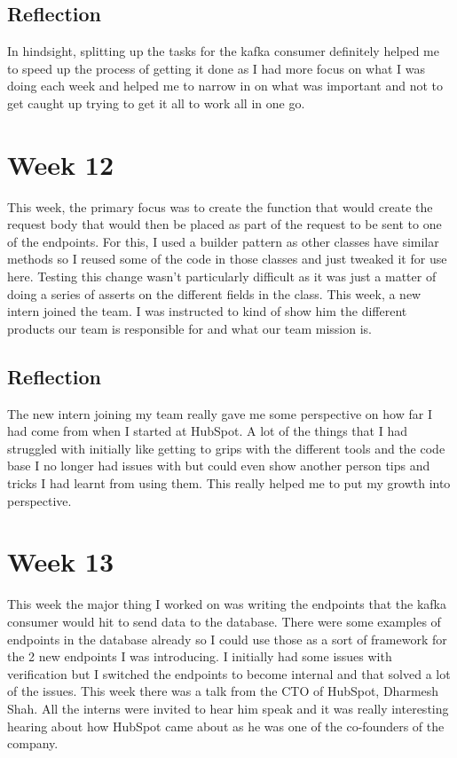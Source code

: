 \subsection{Reflection}
In hindsight, splitting up the tasks for the kafka consumer definitely helped me to speed up the process of getting it done as I had more focus on what I was doing each week and helped me to narrow in on what was important and not to get caught up trying to get it all to work all in one go. 
\section{Week 12}
This week, the primary focus was to create the function that would create the request body that would then be placed as part of the request to be sent to one of the endpoints. For this, I used a builder pattern as other classes have similar methods so I reused some of the code in those classes and just tweaked it for use here. Testing this change wasn't particularly difficult as it was just a matter of doing a series of asserts on the different fields in the class. \newline This week, a new intern joined the team. I was instructed to kind of show him the different products our team is responsible for and what our team mission is.

\subsection{Reflection}
The new intern joining my team really gave me some perspective on how far I had come from when I started at HubSpot. A lot of the things that I had struggled with initially like getting to grips with the different tools and the code base I no longer had issues with but could even show another person tips and tricks I had learnt from using them. This really helped me to put my growth into perspective. 
\section{Week 13}
This week the major thing I worked on was writing the endpoints that the kafka consumer would hit to send data to the database. There were some examples of endpoints in the database already so I could use those as a sort of framework for the 2 new endpoints I was introducing. I initially had some issues with verification but I switched the endpoints to become internal and that solved a lot of the issues. \newline This week there was a talk from the CTO of HubSpot, Dharmesh Shah. All the interns were invited to hear him speak and it was really interesting hearing about how HubSpot came about as he was one of the co-founders of the company. 

